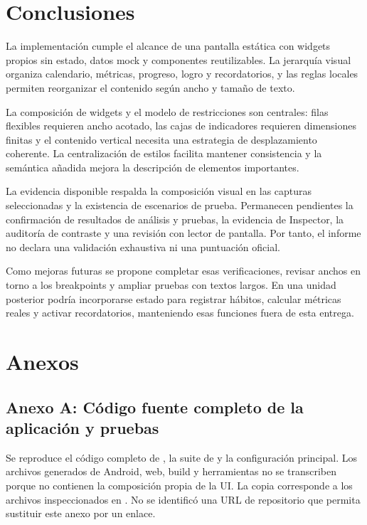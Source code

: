\documentclass[12pt,a4paper]{article}
\newcommand{\codigo}[1]{\texttt{\detokenize{#1}}}
\begin{document}
\section{Conclusiones}
La implementación cumple el alcance de una pantalla estática con widgets propios sin estado, datos mock y componentes reutilizables. La jerarquía visual organiza calendario, métricas, progreso, logro y recordatorios, y las reglas locales permiten reorganizar el contenido según ancho y tamaño de texto.

La composición de widgets y el modelo de restricciones son centrales: filas flexibles requieren ancho acotado, las cajas de indicadores requieren dimensiones finitas y el contenido vertical necesita una estrategia de desplazamiento coherente. La centralización de estilos facilita mantener consistencia y la semántica añadida mejora la descripción de elementos importantes.

La evidencia disponible respalda la composición visual en las capturas seleccionadas y la existencia de escenarios de prueba. Permanecen pendientes la confirmación de resultados de análisis y pruebas, la evidencia de Inspector, la auditoría de contraste y una revisión con lector de pantalla. Por tanto, el informe no declara una validación exhaustiva ni una puntuación oficial.

Como mejoras futuras se propone completar esas verificaciones, revisar anchos en torno a los breakpoints y ampliar pruebas con textos largos. En una unidad posterior podría incorporarse estado para registrar hábitos, calcular métricas reales y activar recordatorios, manteniendo esas funciones fuera de esta entrega.
\section{Anexos}
\subsection*{Anexo A: Código fuente completo de la aplicación y pruebas}
Se reproduce el código completo de \codigo{lib}, la suite de \codigo{test} y la configuración principal. Los archivos generados de Android, web, build y herramientas no se transcriben porque no contienen la composición propia de la UI. La copia corresponde a los archivos inspeccionados en \codigo{E:\desII}. No se identificó una URL de repositorio que permita sustituir este anexo por un enlace.
\end{document}
